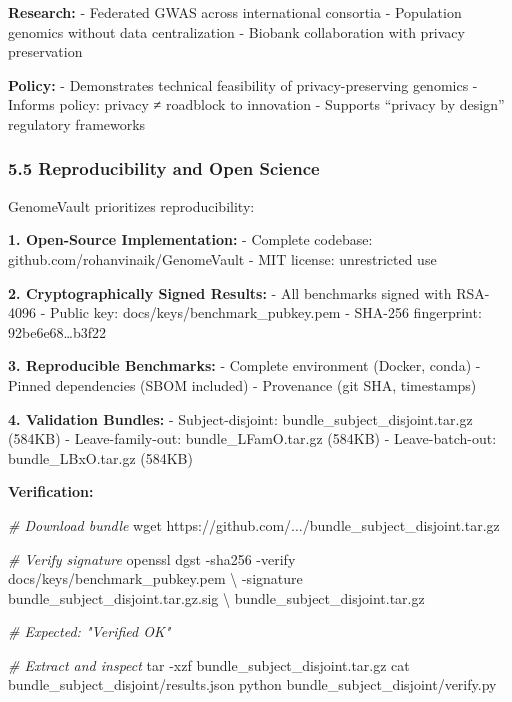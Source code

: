 \documentclass[
  11pt,
]{article}
\newenvironment{Shaded}{}{}
\newcommand{\AttributeTok}[1]{\textcolor[rgb]{0.49,0.56,0.16}{#1}}
\newcommand{\CommentTok}[1]{\textcolor[rgb]{0.38,0.63,0.69}{\textit{#1}}}
\newcommand{\DataTypeTok}[1]{\textcolor[rgb]{0.56,0.13,0.00}{#1}}
\newcommand{\ExtensionTok}[1]{#1}
\newcommand{\FunctionTok}[1]{\textcolor[rgb]{0.02,0.16,0.49}{#1}}
\newcommand{\NormalTok}[1]{#1}
\begin{document}
\textbf{Research:} - Federated GWAS across international consortia -
Population genomics without data centralization - Biobank collaboration
with privacy preservation

\textbf{Policy:} - Demonstrates technical feasibility of
privacy-preserving genomics - Informs policy: privacy ≠ roadblock to
innovation - Supports ``privacy by design'' regulatory frameworks

\subsubsection{5.5 Reproducibility and Open
Science}\label{reproducibility-and-open-science}

GenomeVault prioritizes reproducibility:

\textbf{1. Open-Source Implementation:} - Complete codebase:
github.com/rohanvinaik/GenomeVault - MIT license: unrestricted use

\textbf{2. Cryptographically Signed Results:} - All benchmarks signed
with RSA-4096 - Public key: docs/keys/benchmark\_pubkey.pem - SHA-256
fingerprint: 92be6e68\ldots b3f22

\textbf{3. Reproducible Benchmarks:} - Complete environment (Docker,
conda) - Pinned dependencies (SBOM included) - Provenance (git SHA,
timestamps)

\textbf{4. Validation Bundles:} - Subject-disjoint:
bundle\_subject\_disjoint.tar.gz (584KB) - Leave-family-out:
bundle\_LFamO.tar.gz (584KB) - Leave-batch-out: bundle\_LBxO.tar.gz
(584KB)

\textbf{Verification:}

\begin{Shaded}
\begin{Highlighting}[]
\CommentTok{\# Download bundle}
\FunctionTok{wget}\NormalTok{ https://github.com/.../bundle\_subject\_disjoint.tar.gz}

\CommentTok{\# Verify signature}
\ExtensionTok{openssl}\NormalTok{ dgst }\AttributeTok{{-}sha256} \AttributeTok{{-}verify}\NormalTok{ docs/keys/benchmark\_pubkey.pem }\DataTypeTok{\textbackslash{}}
  \AttributeTok{{-}signature}\NormalTok{ bundle\_subject\_disjoint.tar.gz.sig }\DataTypeTok{\textbackslash{}}
\NormalTok{  bundle\_subject\_disjoint.tar.gz}

\CommentTok{\# Expected: "Verified OK"}

\CommentTok{\# Extract and inspect}
\FunctionTok{tar} \AttributeTok{{-}xzf}\NormalTok{ bundle\_subject\_disjoint.tar.gz}
\FunctionTok{cat}\NormalTok{ bundle\_subject\_disjoint/results.json}
\ExtensionTok{python}\NormalTok{ bundle\_subject\_disjoint/verify.py}
\end{Highlighting}
\end{Shaded}
\end{document}
